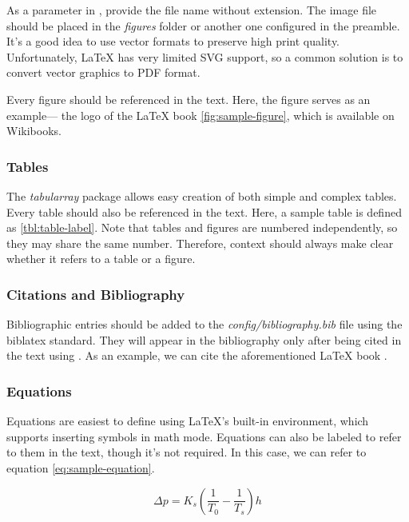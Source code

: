 As a parameter in , provide the file name without extension. The image file should be placed
in the \emph{figures} folder or another one configured in the preamble.
It’s a good idea to use vector formats to preserve high
print quality. Unfortunately, LaTeX has very limited
SVG support, so a common solution is to convert vector graphics
to PDF format.

Every figure should be referenced in the text. Here, the figure serves as an example—
the logo of the LaTeX book \ref{fig:sample-figure}, which
is available on Wikibooks.

\subsubsection{Tables}



The \emph{tabularray} package allows easy creation of both simple
and complex tables. Every table should also be referenced
in the text. Here, a sample table is defined as
\ref{tbl:table-label}. Note that tables and figures
are numbered independently, so they may share the same number. Therefore,
context should always make clear whether it refers to a table or
a figure.

\subsubsection{Citations and Bibliography}

Bibliographic entries should be added to the
\emph{config/bibliography.bib} file using the biblatex standard. They will appear
in the bibliography only after being cited in the text
using . As an example, we can cite
the aforementioned LaTeX book \cite{book:latex}.

\subsubsection{Equations}

Equations are easiest to define using LaTeX’s built-in
 environment, which supports
inserting symbols in math mode. Equations can also be labeled
to refer to them in the text, though it's not required. In this case,
we can refer to equation \ref{eq:sample-equation}.

\begin{equation} \label{eq:sample-equation}
    \Delta p = K_s (\frac{1}{T_0} - \frac{1}{T_s}) h
\end{equation}


